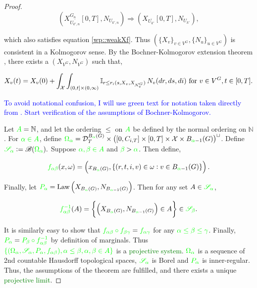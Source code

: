 \documentclass[12pt]{article}
\newcommand{\skipLine}{\vspace{12pt}}
\newcommand{\mb}{\mathbb}
\newcommand{\mc}{\mathcal}
\newcommand{\ms}{\mathscr}
\newcommand{\ov}{\overline}
\newcommand{\te}{\text}
\newcommand{\tb}{\textcolor{blue}}
\newcommand{\tg}{\textcolor{green}}
\newcommand{\defeq}{:=}								%
\newcommand{\cad}{\mc{D}}							%
\newcommand{\sta}{\mc{X}}							%
\newcommand{\gneigh}[2]{\mc{N}^{#1}_{#2}}			%
\newcommand{\cl}[1]{\ov{#1}}						%
\newcommand{\Xf}{X}									%
\newcommand{\poiss}{N}								%
\newcommand{\rate}{r}								%
\newcommand{\xf}{x}									%
\newcommand{\dpoiss}{\omega}						%
\newcommand{\poissv}[1]{_{#1}}						%
\newcommand{\vind}[1]{_{#1}}						%
\newcommand{\tme}[1]{(#1)}							%
\newcommand{\tmi}[1]{#1}							%
\newcommand{\gind}[1]{^{#1}}						%
\newcommand{\vpara}[1]{^{#1}}						%
\newcommand{\stpara}[1]{_{#1}}						%
\newcommand{\tpara}[1]{_{#1}}						%
\newcommand{\jumpibd}[2]{C_{#1,#2}}					%
\newcommand{\tmepro}[3]{
\ifstrempty{#3}{
	(#1,#2)}{
	(#1,#2,#3)}}									%
\newcommand{\trnc}[1]{B_{#1}}						%
\newcommand{\dit}[2]{_{#1,#2}}						%
\newcommand{\law}{\te{Law}}							%
\renewcommand{\it}[1]{_{#1}}						%
\begin{document}
\begin{proof}
\[\left(\Xf\gind{G\it{n}}\vind{\cl{U\dit{k'}{n}}}\tmi{[0,T]},\poiss\poissv{U\dit{k'}{n}}\right)\Rightarrow \left(\Xf\vind{\cl{U\it{k'}}}\tmi{[0,T]},\poiss\poissv{U\it{k'}}\right),\]

which also satisfies equation \eqref{wp::weakXf}. Thus \(\left(\{\Xf\vind{v}\}_{v \in V\gind{G}}, \{\poiss\poissv{u}\}_{u \in V\gind{G}}\right)\) is consistent in a Kolmogorov sense. By the Bochner-Kolmogorov extension theorem \cite{BezCim14}, there exists a \(\left(\Xf\vind{V\gind{G}},\poiss\poissv{V\gind{G}}\right)\) such that,

\[\Xf\vind{v}\tme{t} = \Xf\vind{v}\tme{0} + \int_\sta\int_{(0,t]\times (0,\infty)} \mb{I}_{r \leq \rate\stpara{i}\tmepro{s}{\Xf\vind{v}}{\Xf\vind{\gneigh{G}{v}}}}\,\poiss\poissv{v}(dr,ds,di) \te{ for } v \in V\gind{G}, t \in [0,T].\]

\tb{To avoid notational confusion, I will use green text for notation taken directly from \cite{BezCim14}. Start verification of the assumptions of Bochner-Kolmogorov.}

\skipLine

Let \(\tg{A} = \mb{N}\), and let the ordering \(\leq\) on \(\tg{A}\) be defined by the normal ordering on \(\mb{N}\). For \(\tg{\alpha \in A}\), define \(\tg{\Omega_\alpha} = \cad\vpara{\trnc{\tg{\alpha}}(G)}\tpara{T}\times \left([0,\jumpibd{i}{T}] \times [0,T] \times \sta \times \trnc{\tg{\alpha}-1}(G)\right)^{\sqcup}\). Define \(\tg{\ms{S}_\alpha} \defeq \ms{B}(\tg{\Omega_\alpha}).\) Suppose \(\tg{\alpha,\beta\in A}\) and \(\tg{\beta} > \tg{\alpha}\). Then define,

\[\tg{f_{\alpha\beta}}(\xf,\dpoiss) = \left(\xf\vind{\trnc{\tg{\alpha}}(G)}, \{(r,t,i,v) \in \dpoiss: v \in \trnc{\tg{\alpha}-1}(G)\}\right).\]

Finally, let \(\tg{P_\alpha} = \law\left(\Xf\vind{\trnc{\tg{\alpha}}(G)},\poiss\poissv{\trnc{\tg{\alpha}-1}(G)}\right)\). Then for any set \(A \in \tg{\ms{S}_\alpha}\), 

\[\tg{f^{-1}_{\alpha\beta}}(A) = \left\{\left(\Xf\vind{\trnc{\tg{\alpha}}(G)},\poiss\poissv{\trnc{\tg{\alpha}-1}(G)}\right) \in A\right\} \in \tg{\ms{S}_\beta}.\]

It is similarly easy to show that \(\tg{f_{\alpha\beta}\circ f_{\beta\gamma}} = \tg{f_{\alpha\gamma}}\) for any \(\tg{\alpha\leq \beta\leq\gamma}\). Finally, \(\tg{P_\alpha} = \tg{P_\beta \circ f_{\alpha\beta}^{-1}}\) by definition of marginals. Thus \(\tg{\{(\Omega_\alpha,\ms{S}_\alpha,P_\alpha,f_{\alpha\beta}), \alpha \leq \beta, \alpha,\beta\in A\}}\) is a \tg{projective system}. \(\tg{\Omega_\alpha}\) is a sequence of 2nd countable Hausdorff topological spaces, \(\tg{\ms{S}_\alpha}\) is Borel and \(\tg{P_\alpha}\) is inner-regular. Thus, the assumptions of the theorem are fulfilled, and there exists a unique \tg{projective limit}.


\end{proof}
\end{document}
